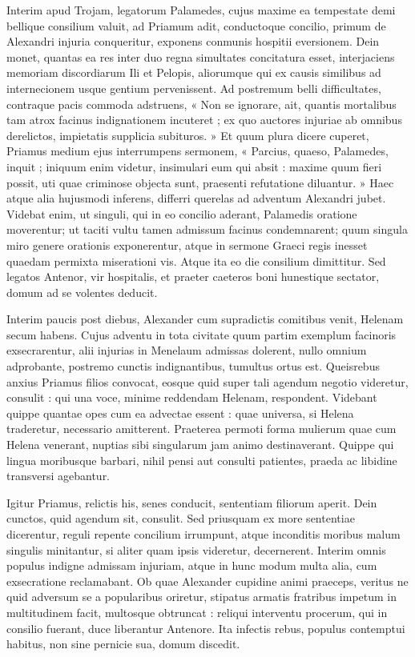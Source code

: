 \documentclass{article}
\begin{document}
\begin{pages}
\begin{Rightside}
Interim apud Trojam, legatorum Palamedes, cujus maxime ea tempestate demi bellique consilium valuit, ad Priamum adit, conductoque concilio, primum de Alexandri injuria conqueritur, exponens conmunis hospitii eversionem. Dein monet, quantas ea res inter duo regna simultates concitatura esset, interjaciens memoriam discordiarum Ili et Pelopis, aliorumque qui ex causis similibus ad internecionem usque gentium pervenissent. Ad postremum belli difficultates, contraque pacis commoda adstruens, « Non se ignorare, ait, quantis mortalibus tam atrox facinus indignationem incuteret ; ex quo auctores injuriae ab omnibus derelictos, impietatis supplicia subituros. » Et quum plura dicere cuperet, Priamus medium ejus interrumpens sermonem, « Parcius, quaeso, Palamedes, inquit ; iniquum enim videtur, insimulari eum qui absit : maxime quum fieri possit, uti quae criminose objecta sunt, praesenti refutatione diluantur. » Haec atque alia hujusmodi inferens, differri querelas ad adventum Alexandri jubet. Videbat enim, ut singuli, qui in eo concilio aderant, Palamedis oratione moverentur; ut taciti vultu tamen admissum facinus condemnarent; quum singula miro genere orationis exponerentur, atque in sermone Graeci regis inesset quaedam permixta miserationi vis. Atque ita eo die consilium dimittitur. Sed legatos Antenor, vir hospitalis, et praeter caeteros boni hunestique sectator, domum ad se volentes deducit.

Interim paucis post diebus, Alexander cum supradictis comitibus venit, Helenam secum habens. Cujus adventu in tota civitate quum partim exemplum facinoris exsecrarentur, alii injurias in Menelaum admissas dolerent, nullo omnium adprobante, postremo cunctis indignantibus, tumultus ortus est. Queisrebus anxius Priamus filios convocat, eosque quid super tali agendum negotio videretur, consulit : qui una voce, minime reddendam Helenam, respondent. Videbant quippe quantae opes cum ea advectae essent : quae universa, si Helena traderetur, necessario amitterent. Praeterea permoti forma mulierum quae cum Helena venerant, nuptias sibi singularum jam animo destinaverant. Quippe qui lingua moribusque barbari, nihil pensi aut consulti patientes, praeda ac libidine transversi agebantur.

Igitur Priamus, relictis his, senes conducit, sententiam filiorum aperit. Dein cunctos, quid agendum sit, consulit. Sed priusquam ex more sententiae dicerentur, reguli repente concilium irrumpunt, atque inconditis moribus malum singulis minitantur, si aliter quam ipsis videretur, decernerent. Interim omnis populus indigne admissam injuriam, atque in hunc modum multa alia, cum exsecratione reclamabant. Ob quae Alexander cupidine animi praeceps, veritus ne quid adversum se a popularibus oriretur, stipatus armatis fratribus impetum in multitudinem facit, multosque obtruncat : reliqui interventu procerum, qui in consilio fuerant, duce liberantur Antenore. Ita infectis rebus, populus contemptui habitus, non sine pernicie sua, domum discedit.


\end{Rightside}
\end{pages}
\end{document}
